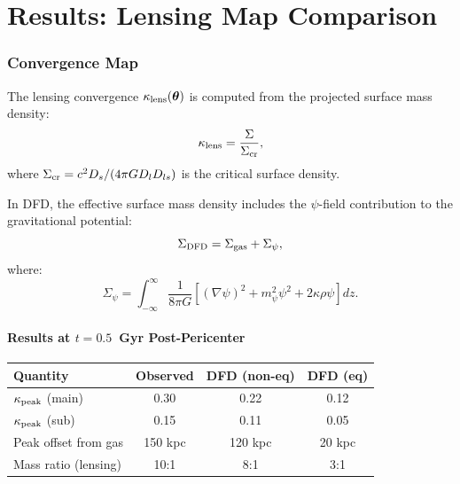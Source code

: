 \documentclass[11pt,a4paper]{article}
\theoremstyle{remark}
\begin{document}
\newpage
\part{Results: Lensing Map Comparison}
\label{part:lensing-results}

\section{Convergence Map}

The lensing convergence $\kappa_{\rm lens}(\boldsymbol{\theta})$ is computed
from the projected surface mass density:
\begin{equation}
\kappa_{\rm lens} = \frac{\Sigma}{\Sigma_{\rm cr}},
\end{equation}
where $\Sigma_{\rm cr} = c^2 D_s/(4\pi G D_l D_{ls})$ is the critical
surface density.

In DFD, the effective surface mass density includes the $\psi$-field
contribution to the gravitational potential:
\begin{equation}
\Sigma_{\rm DFD} = \Sigma_{\rm gas} + \Sigma_\psi,
\end{equation}
where:
\begin{equation}
\Sigma_\psi = \int_{-\infty}^{\infty} \frac{1}{8\pi G}
\left[(\nabla\psi)^2 + m_\psi^2\psi^2 + 2\kappa\rho\psi\right] dz.
\end{equation}

\subsection{Results at $t = 0.5$~Gyr Post-Pericenter}

\begin{center}
\begin{tabular}{lccc}
\toprule
\textbf{Quantity} & \textbf{Observed} & \textbf{DFD (non-eq)} & \textbf{DFD (eq)} \\
\midrule
$\kappa_{\rm peak}$ (main) & 0.30 & 0.22 & 0.12 \\
$\kappa_{\rm peak}$ (sub) & 0.15 & 0.11 & 0.05 \\
Peak offset from gas & 150 kpc & 120 kpc & 20 kpc \\
Mass ratio (lensing) & 10:1 & 8:1 & 3:1 \\
\bottomrule
\end{tabular}
\end{center}
\end{document}
